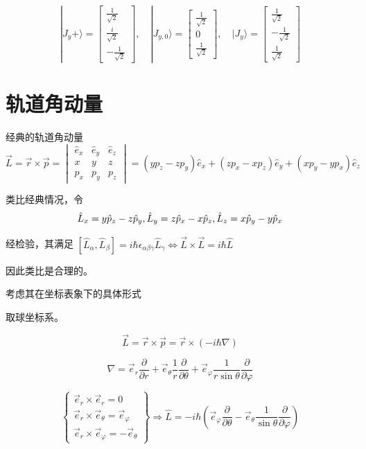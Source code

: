 \documentclass[lang=cn,10pt]{elegantbook}
\begin{document}
\[
|J_y+\rangle = \begin{bmatrix} \frac{1}{\sqrt{2}} \\ \frac{i}{\sqrt{2}} \\ -\frac{1}{\sqrt{2}} \end{bmatrix}, \quad |J_{y,0}\rangle = \begin{bmatrix} \frac{1}{\sqrt{2}} \\ 0 \\ \frac{1}{\sqrt{2}} \end{bmatrix}, \quad |J_y\rangle = \begin{bmatrix} \frac{1}{\sqrt{2}} \\ -\frac{1}{\sqrt{2}} \\ \frac{1}{\sqrt{2}} \end{bmatrix}
\]

\section{轨道角动量}

经典的轨道角动量
\[
\vec{L} = \vec{r} \times \vec{p} = \begin{vmatrix}
	\hat{e}_x & \hat{e}_y & \hat{e}_z \\
	x & y & z \\
	p_x & p_y & p_z
\end{vmatrix} = (y p_z - z p_y) \hat{e}_x + (z p_x - x p_z) \hat{e}_y + (x p_y - y p_x) \hat{e}_z
\]

类比经典情况，令
\[
\hat{L}_x = y \hat{p}_z - z \hat{p}_y, \\
\hat{L}_y = z \hat{p}_x - x \hat{p}_z, \\
\hat{L}_z = x \hat{p}_y - y \hat{p}_x
\]

经检验，其满足 \([ \hat{L}_\alpha, \hat{L}_\beta ] = i\hbar \epsilon_{\alpha\beta\gamma} \hat{L}_\gamma \Leftrightarrow \vec{L} \times \vec{L} = i\hbar \hat{L}\)

因此类比是合理的。

考虑其在坐标表象下的具体形式

取球坐标系。

\[
\vec{L} = \vec{r} \times \vec{p} = \vec{r} \times (-i\hbar \nabla)
\]

\[
\nabla = \vec{e}_r \frac{\partial}{\partial r} + \vec{e}_\theta \frac{1}{r} \frac{\partial}{\partial \theta} + \vec{e}_\varphi \frac{1}{r \sin \theta} \frac{\partial}{\partial \varphi}
\]

\[
\left\{
\begin{array}{l}
	\vec{e}_r \times \vec{e}_r = 0 \\
	\vec{e}_r \times \vec{e}_\theta = \vec{e}_\varphi \\
	\vec{e}_r \times \vec{e}_\varphi = -\vec{e}_\theta
\end{array}
\right\} \Rightarrow \hat{L} = -i\hbar \left( \vec{e}_\varphi \frac{\partial}{\partial \theta} - \vec{e}_\theta \frac{1}{\sin\theta} \frac{\partial}{\partial \varphi} \right)
\]
\end{document}
